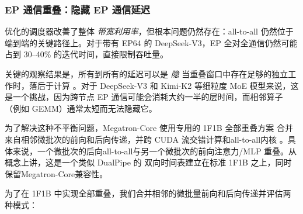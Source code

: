 \documentclass[10pt,logo,copyright]{nvidiatechreport_zh}
\begin{document}
\subsubsection{EP 通信重叠：隐藏 EP 通信延迟}\label{sec:comm-overlap}

优化的调度器改善了整体 \textit{带宽利用率}，但根本问题仍然存在：all-to-all 仍然位于端到端的关键路径上。对于带有 EP64 的 DeepSeek-V3，EP 全对全通信仍然可能占到 30--40\% 的迭代时间，直接限制吞吐量。

关键的观察结果是，所有到所有的延迟可以是 \textit{隐} 当重叠窗口中存在足够的独立工作时，落后于计算 \cite{wang2022coconet,wang2024flux}。对于 DeepSeek-V3 和 Kimi-K2 等细粒度 MoE 模型来说，这是一个挑战，因为跨节点 EP 通信可能会消耗大约一半的层时间，而相邻算子（例如 GEMM）通常太短而无法隐藏它。

为了解决这种不平衡问题，Megatron-Core 使用专用的 1F1B 全部重叠方案 \cite{1f1boverlap} 合并来自相邻微批次的前向和后向传递，并跨 CUDA 流交错计算和all-to-all内核 \cite{narayanan2019pipedream,huang2019gpipe}。具体来说，一个微批次的后向all-to-all与另一个微批次的前向注意力/MLP 重叠。从概念上讲，这是一个类似 DualPipe 的 \cite{hfdualpipe} 双向时间表建立在标准 1F1B 之上，同时保留Megatron-Core兼容性。

为了在 1F1B 中实现全部重叠，我们合并相邻的微批量前向和后向传递并评估两种模式：
\end{document}
